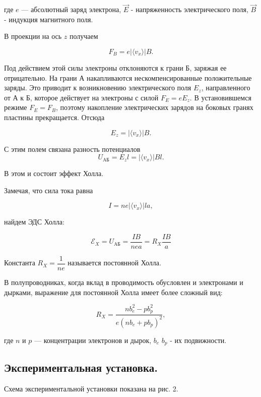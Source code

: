 \documentclass[a4paper]{article}
\theoremstyle{definition}
\theoremstyle{remark}
\begin{document}
	где $e$ --- абсолютный заряд электрона, $\vec{E}$ - напряженность электрического поля, $\vec{B}$ - индукция магнитного поля.
	
	В проекции на ось $z$ получаем
	
	$$ F_{B}=e | \langle {v_{x}} \rangle | B.$$
	
	Под действием этой силы электроны отклоняются к грани Б, заряжая ее отрицательно. На грани А накапливаются нескомпенсированные положительные заряды. Это приводит к возникновению электрического поля $E_{z}$, направленного от А к Б, которое действует на электроны с силой $F_{E}=eE_{z}$. В установившемся режиме $F_{E}=F_{B}$, поэтому накопление электрических зарядов на боковых гранях пластины прекращается. Отсюда
	
	$$ E_{z}=| \langle {v_{x}} \rangle | B.$$
	
	С этим полем связана разность потенциалов $$U_{\text{AБ}}=E_{z}l=| \langle {v_{x}} \rangle | Bl.$$
	
	В этом и состоит эффект Холла. \medskip
	
	Замечая, что сила тока равна
	
	$$ I=ne| \langle {v_{x}} \rangle |la,$$
	
	найдем ЭДС Холла:
	
\begin{equation}\label{Rx}
	\mathscr{E}_{X}=U_{\text{AБ}}=\dfrac{IB}{nea}=R_{X}\dfrac{IB}{a}
\end{equation}
	
	Константа $R_{X}=\dfrac{1}{ne}$ называется постоянной Холла. \medskip
	
	В полупроводниках, когда вклад в проводимость обусловлен и электронами и дырками, выражение для постоянной Холла имеет более сложный вид:
	
	$$R_{X}=\dfrac{nb^{2}_{e}-pb^{2}_{p}}{e(nb_{e}+pb_{p})^{2}},$$
	
	где $n$ и $p$ --- концентрации электронов и дырок, $b_{e}$ $b_{p}$ - их подвижности.
	
	\subsection{Экспериментальная установка.}
	Схема экспериментальной установки показана на рис. 2.
	
\end{document}
